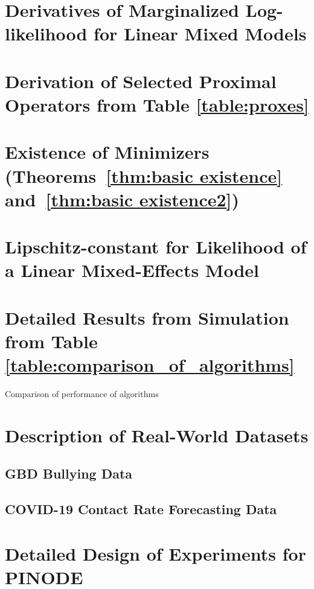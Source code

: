 \documentclass[12pt,a4paper]{book}
\numberwithin{equation}{section} %
\numberwithin{figure}{section} %
\numberwithin{table}{section} %
\begin{document}
\section{Derivatives of Marginalized Log-likelihood for Linear Mixed Models}
\label{appendix:derivatives_of_lmm}


\section{Derivation of Selected Proximal Operators from Table \ref{table:proxes}}
\label{appendix:proxes}


\section{Existence of Minimizers (Theorems~\ref{thm:basic existence} and~\ref{thm:basic existence2})}
\label{adx:basic existence}


\section{Lipschitz-constant for Likelihood of a Linear Mixed-Effects Model}
\label{appendix:lipschitz_constant}


\section{Detailed Results from Simulation from Table \ref{table:comparison_of_algorithms}}
\label{appendix:detailed_comparison}
\begin{table}[t]
    \centering
    \resizebox{\columnwidth}{!}{}
    \caption{Comparison of performance of algorithms}
    \label{table:detailed_comparison_of_algorithms}
\end{table}

\section{Description of Real-World Datasets}
\subsection{GBD Bullying Data}


\subsection{COVID-19 Contact Rate Forecasting Data}



\section{Detailed Design of Experiments for PINODE}

\end{document}
